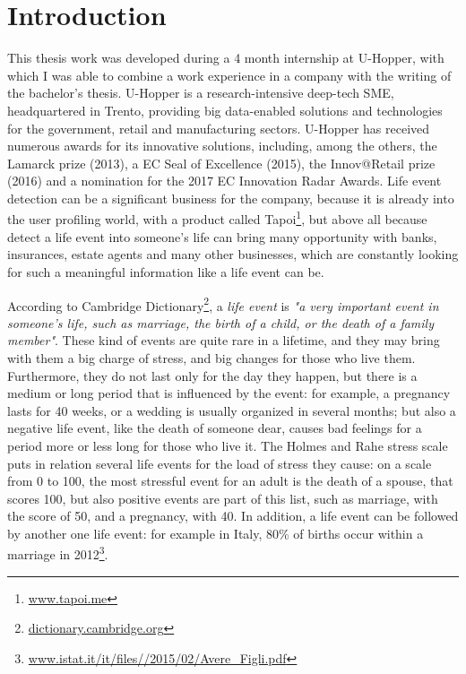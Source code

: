 \chapter{Introduction}
\label{cha:intro}

This thesis work was developed during a 4 month internship at U-Hopper, with which I was able to combine a work experience in a company with the writing of the bachelor's thesis. U-Hopper is a research-intensive deep-tech SME, headquartered in Trento, providing big data-enabled solutions and technologies for the government, retail and manufacturing sectors. U-Hopper has received numerous awards for its innovative solutions, including, among the others, the Lamarck prize (2013), a EC Seal of Excellence (2015), the Innov@Retail prize (2016) and a nomination for the 2017 EC Innovation Radar Awards. Life event detection can be a significant business for the company, because it is already into the user profiling world, with a product called Tapoi\footnote{\url{www.tapoi.me}}, but above all because detect a life event into someone's life can bring many opportunity with banks, insurances, estate agents and many other businesses, which are constantly looking for such a meaningful information like a life event can be.

According to Cambridge Dictionary\footnote{\url{dictionary.cambridge.org}}, a \emph{life event} is \textit{"a very important event in someone's life, such as marriage, the birth of a child, or the death of a family member"}. These kind of events are quite rare in a lifetime, and they may bring with them a big charge of stress, and big changes for those who live them. Furthermore, they do not last only for the day they happen, but there is a medium or long period that is influenced by the event: for example, a pregnancy lasts for 40 weeks, or a wedding is usually organized in several months; but also a negative life event, like the death of someone dear, causes bad feelings for a period more or less long for those who live it. The Holmes and Rahe stress scale \cite{holmes1967social} puts in relation several life events for the load of stress they cause: on a scale from 0 to 100, the most stressful event for an adult is the death of a spouse, that scores 100, but also positive events are part of this list, such as marriage, with the score of 50, and a pregnancy, with 40. In addition, a life event can be followed by another one life event: for example in Italy, 80\% of births occur within a marriage in 2012\footnote{\url{www.istat.it/it/files//2015/02/Avere_Figli.pdf}}.

